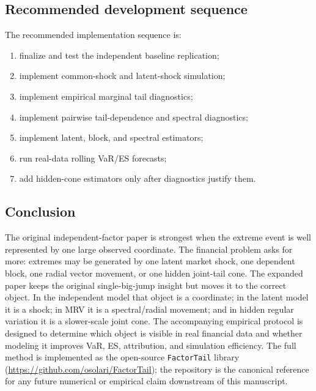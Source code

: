 \subsection{Recommended development sequence}

The recommended implementation sequence is:
\begin{enumerate}
\item finalize and test the independent baseline replication;
\item implement common-shock and latent-shock simulation;
\item implement empirical marginal tail diagnostics;
\item implement pairwise tail-dependence and spectral diagnostics;
\item implement latent, block, and spectral estimators;
\item run real-data rolling VaR/ES forecasts;
\item add hidden-cone estimators only after diagnostics justify them.
\end{enumerate}

\subsection{Conclusion}

The original independent-factor paper is strongest when the extreme event is
well represented by one large observed coordinate. The financial problem asks
for more: extremes may be generated by one latent market shock, one dependent
block, one radial vector movement, or one hidden joint-tail cone. The
expanded paper keeps the original single-big-jump insight but moves it to
the correct object. In the independent model that object is a coordinate;
in the latent model it is a shock; in MRV it is a spectral/radial movement;
and in hidden regular variation it is a slower-scale joint cone. The
accompanying empirical protocol is designed to determine which object is
visible in real financial data and whether modeling it improves VaR, ES,
attribution, and simulation efficiency. The full method is implemented as
the open-source \texttt{FactorTail} library
(\url{https://github.com/osolari/FactorTail}); the repository is the
canonical reference for any future numerical or empirical claim downstream
of this manuscript.
